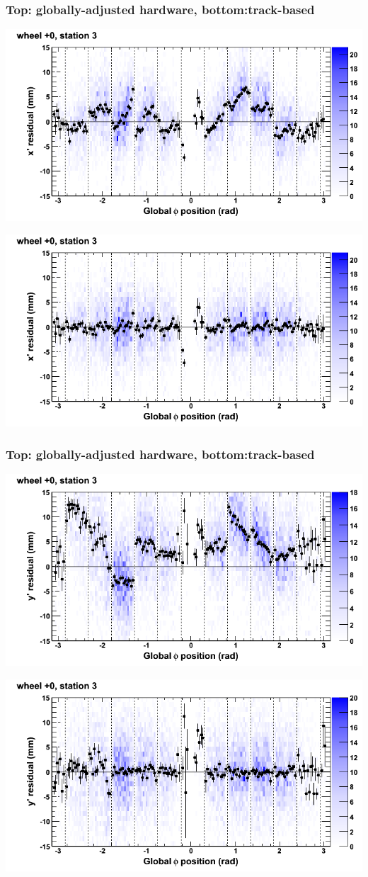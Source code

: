 \documentclass[compress]{beamer}
\begin{document}
\begin{frame}
\frametitle{Top: globally-adjusted hardware, bottom:track-based}
\includegraphics[width=0.7\linewidth]{NOV4_mapplots_HW/DTvsphi_st3whC_x.png}

\includegraphics[width=0.7\linewidth]{NOV4_mapplots/DTvsphi_st3whC_x.png}
\end{frame}

\begin{frame}
\frametitle{Top: globally-adjusted hardware, bottom:track-based}
\includegraphics[width=0.7\linewidth]{NOV4_mapplots_HW/DTvsphi_st3whC_y.png}

\includegraphics[width=0.7\linewidth]{NOV4_mapplots/DTvsphi_st3whC_y.png}
\end{frame}
\end{document}
